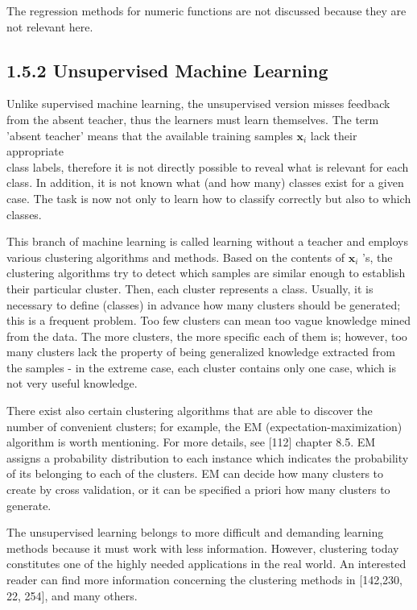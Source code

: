 \documentclass[10pt]{book}
\begin{document}
The regression methods for numeric functions are not discussed because they are not relevant here.

\subsection*{1.5.2 Unsupervised Machine Learning}
Unlike supervised machine learning, the unsupervised version misses feedback from the absent teacher, thus the learners must learn themselves. The term 'absent teacher' means that the available training samples $\mathbf{x}_{i}$ lack their appropriate\\
class labels, therefore it is not directly possible to reveal what is relevant for each class. In addition, it is not known what (and how many) classes exist for a given case. The task is now not only to learn how to classify correctly but also to which classes.

This branch of machine learning is called learning without a teacher and employs various clustering algorithms and methods. Based on the contents of $\mathbf{x}_{i}$ 's, the clustering algorithms try to detect which samples are similar enough to establish their particular cluster. Then, each cluster represents a class. Usually, it is necessary to define (classes) in advance how many clusters should be generated; this is a frequent problem. Too few clusters can mean too vague knowledge mined from the data. The more clusters, the more specific each of them is; however, too many clusters lack the property of being generalized knowledge extracted from the samples - in the extreme case, each cluster contains only one case, which is not very useful knowledge.

There exist also certain clustering algorithms that are able to discover the number of convenient clusters; for example, the EM (expectation-maximization) algorithm is worth mentioning. For more details, see [112] chapter 8.5. EM assigns a probability distribution to each instance which indicates the probability of its belonging to each of the clusters. EM can decide how many clusters to create by cross validation, or it can be specified a priori how many clusters to generate.

The unsupervised learning belongs to more difficult and demanding learning methods because it must work with less information. However, clustering today constitutes one of the highly needed applications in the real world. An interested reader can find more information concerning the clustering methods in [142,230, 22, 254], and many others.
\end{document}
